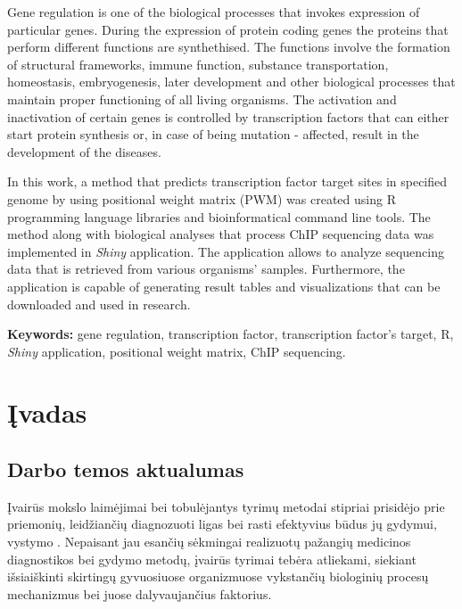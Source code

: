 \documentclass[12pt]{article}
\begin{document}
Gene regulation is one of the biological processes that invokes expression of
particular genes. During the expression of protein coding genes the proteins
that perform different functions are synthethised. The functions involve the
formation of structural frameworks, immune function, substance transportation,
homeostasis, embryogenesis, later development and other biological processes
that maintain proper functioning of all living organisms. The activation and
inactivation of certain genes is controlled by transcription factors that can
either start protein synthesis or, in case of being mutation - affected,
result in the development of the diseases.

In this work, a method that predicts transcription factor target sites in
specified genome by using positional weight matrix (PWM) was created using R
programming language libraries and bioinformatical command line tools. The
method along with biological analyses that process ChIP sequencing data was
implemented in \emph{Shiny} application. The application allows to analyze
sequencing data that is retrieved from various organisms' samples. Furthermore,
the application is capable of generating result tables and visualizations that
can be downloaded and used in research.

\hfill \break
\textbf{Keywords:} gene regulation, transcription factor, transcription factor's
target, R, \emph{Shiny} application, positional weight matrix, ChIP
sequencing.

\newpage


\section{Įvadas}
\subsection*{Darbo temos aktualumas}

Įvairūs mokslo laimėjimai bei tobulėjantys tyrimų metodai stipriai prisidėjo
prie priemonių, leidžiančių diagnozuoti ligas bei rasti efektyvius
būdus jų gydymui, vystymo \cite{ARTICLE18}. Nepaisant jau esančių sėkmingai
realizuotų pažangių medicinos diagnostikos bei gydymo metodų, įvairūs tyrimai
tebėra atliekami, siekiant išsiaiškinti skirtingų gyvuosiuose organizmuose
vyks\-tan\-čių biologinių procesų mechanizmus bei juose dalyvaujančius
faktorius.
\end{document}
